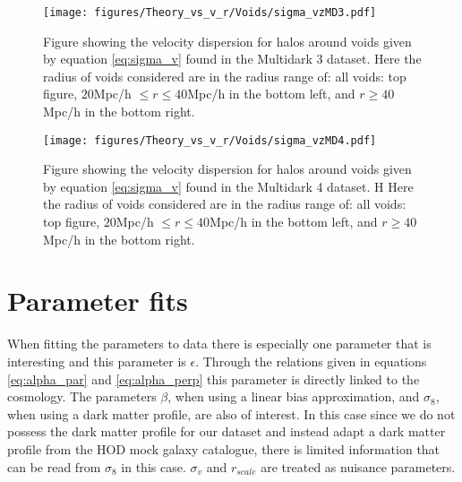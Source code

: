 \begin{figure}[H]
    \texttt{[image: figures/Theory\_vs\_v\_r/Voids/sigma\_vzMD3.pdf]}
    \caption{Figure showing the velocity dispersion for halos around voids given by equation \ref{eq:sigma_v} found in the Multidark 3 dataset. Here the radius of voids considered are in the radius range of: all voids: top figure, $20$Mpc/h $\leq r\leq 40$Mpc/h in the bottom left, and $r\geq 40$Mpc/h in the bottom right.}
    \label{fig:sigmavMD3}
\end{figure}

\begin{figure}[H]
    \texttt{[image: figures/Theory\_vs\_v\_r/Voids/sigma\_vzMD4.pdf]}
    \caption{Figure showing the velocity dispersion for halos around voids given by equation \ref{eq:sigma_v} found in the Multidark 4 dataset. H Here the radius of voids considered are in the radius range of: all voids: top figure, $20$Mpc/h $\leq r\leq 40$Mpc/h in the bottom left, and $r\geq 40$Mpc/h in the bottom right.}
    \label{fig:sigmavMD4}
\end{figure}
\section{Parameter fits}
When fitting the parameters to data there is especially one parameter that is interesting and this parameter is $\epsilon$. Through the relations given in 
equations \ref{eq:alpha_par} and \ref{eq:alpha_perp} this parameter is directly linked to the cosmology. The parameters $\beta$, when using a linear bias approximation, and $\sigma_8$,
when using a dark matter profile, are also of interest. In this case since we do not possess the dark matter profile for our dataset and instead adapt a dark matter profile from the HOD mock galaxy catalogue, there is limited information that can be read from $\sigma_8$ in this case. $\sigma_v$ and $r_{scale}$ are treated as nuisance parameters.

